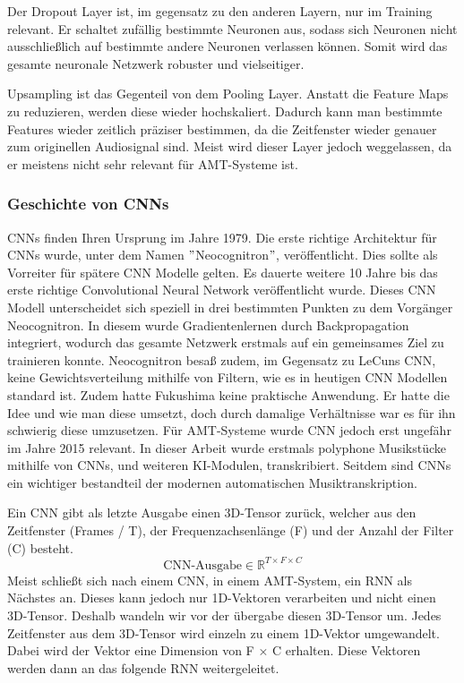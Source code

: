 Der Dropout Layer ist, im gegensatz zu den anderen Layern, nur im Training relevant.
Er schaltet zufällig bestimmte Neuronen aus,
sodass sich Neuronen nicht ausschließlich auf bestimmte andere Neuronen verlassen können.
Somit wird das gesamte neuronale Netzwerk robuster und vielseitiger.

Upsampling ist das Gegenteil von dem Pooling Layer.
Anstatt die Feature Maps zu reduzieren, werden diese wieder hochskaliert.
Dadurch kann man bestimmte Features wieder zeitlich präziser bestimmen,
da die Zeitfenster wieder genauer zum originellen Audiosignal sind.
Meist wird dieser Layer jedoch weggelassen, da er meistens nicht sehr relevant für AMT-Systeme ist.

\subsubsection{Geschichte von CNNs}
CNNs finden Ihren Ursprung im Jahre 1979.
Die erste richtige Architektur für CNNs wurde, unter dem Namen \("\)Neocognitron\("\), veröffentlicht.
\cite{fukushima1980neocognitron}
Dies sollte als Vorreiter für spätere CNN Modelle gelten.
Es dauerte weitere 10 Jahre bis das erste richtige Convolutional Neural Network veröffentlicht wurde.
\cite{lecun1989backpropagation}
Dieses CNN Modell unterscheidet sich speziell in drei bestimmten Punkten zu dem Vorgänger Neocognitron.
In diesem wurde Gradientenlernen durch Backpropagation integriert,
wodurch das gesamte Netzwerk erstmals auf ein gemeinsames Ziel zu trainieren konnte.
Neocognitron besaß zudem, im Gegensatz zu LeCuns CNN,
keine Gewichtsverteilung mithilfe von Filtern, wie es in heutigen CNN Modellen standard ist.
Zudem hatte Fukushima keine praktische Anwendung.
Er hatte die Idee und wie man diese umsetzt, doch durch damalige Verhältnisse war es für ihn schwierig diese umzusetzen.
Für AMT-Systeme wurde CNN jedoch erst ungefähr im Jahre 2015 relevant.
\cite{sigtia2016end}
In dieser Arbeit wurde erstmals polyphone Musikstücke mithilfe von CNNs, und weiteren KI-Modulen, transkribiert.
Seitdem sind CNNs ein wichtiger bestandteil der modernen automatischen Musiktranskription.

Ein CNN gibt als letzte Ausgabe einen 3D-Tensor zurück,
welcher aus den Zeitfenster (Frames / T), der Frequenzachsenlänge (F) und der Anzahl der Filter (C) besteht.
\[
\text{CNN-Ausgabe} \in \mathbb{R}^{T \times F \times C}
\]
Meist schließt sich nach einem CNN, in einem AMT-System, ein RNN als Nächstes an.
Dieses kann jedoch nur 1D-Vektoren verarbeiten und nicht einen 3D-Tensor.
Deshalb wandeln wir vor der übergabe diesen 3D-Tensor um.
Jedes Zeitfenster aus dem 3D-Tensor wird einzeln zu einem 1D-Vektor umgewandelt.
Dabei wird der Vektor eine Dimension von F × C erhalten.
Diese Vektoren werden dann an das folgende RNN weitergeleitet.

